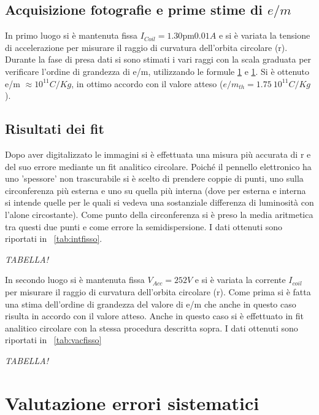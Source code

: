 \documentclass[10pt,a4paper]{article}
\begin{document}
\subsection{Acquisizione fotografie e prime stime di $e/m$}

In primo luogo si è mantenuta fissa $I_{Coil} = \unit{1.30 \pm 0.01}{A}$
e si è variata la tensione di accelerazione per misurare il raggio di curvatura dell'orbita circolare (r). Durante la fase di presa dati si sono stimati i vari raggi con la scala graduata per verificare l'ordine di grandezza di e/m, utilizzando le formule \ref{} e \ref{}. Si è ottenuto e/m $\approx \unit{10^{11}}{C/Kg}$, in ottimo accordo con il valore atteso ($e/m_{th} = \unit{1.75~10^{11}}{C/Kg}$).

\subsection{Risultati dei fit}

Dopo aver digitalizzato le immagini si è effettuata una misura più accurata di r e del suo errore mediante un fit analitico circolare. Poiché il pennello elettronico ha uno 'spessore' non trascurabile si è scelto di prendere coppie di punti, uno sulla circonferenza più esterna e uno su quella più interna (dove per esterna e interna si intende quelle per le quali si vedeva una sostanziale differenza di luminosità con l'alone circostante). Come punto della circonferenza si è preso la media aritmetica tra questi due punti e come errore la semidispersione. I dati ottenuti sono riportati in \tablename{~\ref{tab:intfisso}}.

\emph{TABELLA!}

In secondo luogo si è mantenuta fissa $V_{Acc} = \unit{252}{V}$ e si è variata la corrente $I_{coil}$ per misurare il raggio di curvatura dell'orbita circolare (r). Come prima si è fatta una stima dell'ordine di grandezza del valore di e/m che anche in questo caso risulta in accordo con il valore atteso.
Anche in questo caso si è effettuato in fit analitico circolare con la stessa procedura descritta sopra. I dati ottenuti sono riportati in \tablename{~\ref{tab:vacfisso}}

\emph{TABELLA!}
\section{Valutazione errori sistematici}
\end{document}
